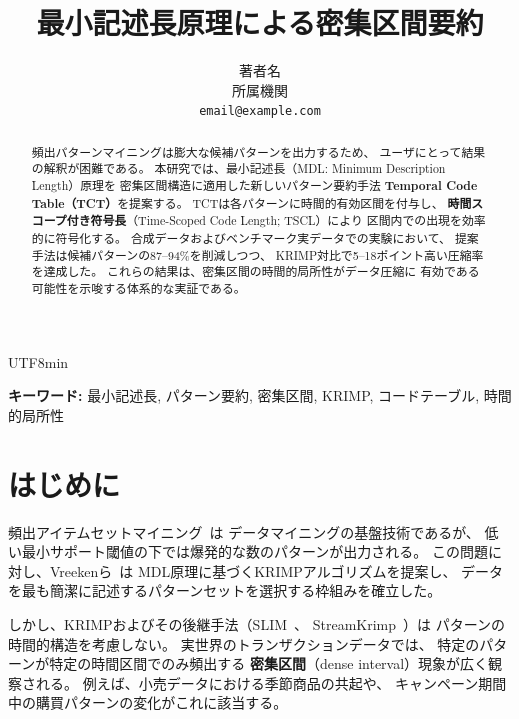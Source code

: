 \documentclass[11pt,a4paper]{article}
\begin{document}
\begin{CJK}{UTF8}{min}

\title{最小記述長原理による密集区間要約}
\author{
  著者名 \\
  所属機関 \\
  \texttt{email@example.com}
}
\date{}
\maketitle

\begin{abstract}
頻出パターンマイニングは膨大な候補パターンを出力するため、
ユーザにとって結果の解釈が困難である。
本研究では、最小記述長（MDL: Minimum Description Length）原理を
密集区間構造に適用した新しいパターン要約手法
\textbf{Temporal Code Table（TCT）}を提案する。
TCTは各パターンに時間的有効区間を付与し、
\textbf{時間スコープ付き符号長}（Time-Scoped Code Length; TSCL）により
区間内での出現を効率的に符号化する。
合成データおよびベンチマーク実データでの実験において、
提案手法は候補パターンの87--94\%を削減しつつ、
KRIMP対比で5--18ポイント高い圧縮率を達成した。
これらの結果は、密集区間の時間的局所性がデータ圧縮に
有効である可能性を示唆する体系的な実証である。
\end{abstract}

\textbf{キーワード:}
最小記述長, パターン要約, 密集区間, KRIMP, コードテーブル, 時間的局所性


\section{はじめに}\label{sec:intro}

頻出アイテムセットマイニング~\cite{agrawal1994fast}は
データマイニングの基盤技術であるが、
低い最小サポート閾値の下では爆発的な数のパターンが出力される。
この問題に対し、Vreekenら~\cite{vreeken2011krimp}は
MDL原理に基づくKRIMPアルゴリズムを提案し、
データを最も簡潔に記述するパターンセットを選択する枠組みを確立した。

しかし、KRIMPおよびその後継手法（SLIM~\cite{smets2012slim}、
StreamKrimp~\cite{van2014streamkrimp}）は
パターンの時間的構造を考慮しない。
実世界のトランザクションデータでは、
特定のパターンが特定の時間区間でのみ頻出する
\textbf{密集区間}（dense interval）現象が広く観察される。
例えば、小売データにおける季節商品の共起や、
キャンペーン期間中の購買パターンの変化がこれに該当する。


\end{CJK}
\end{document}

